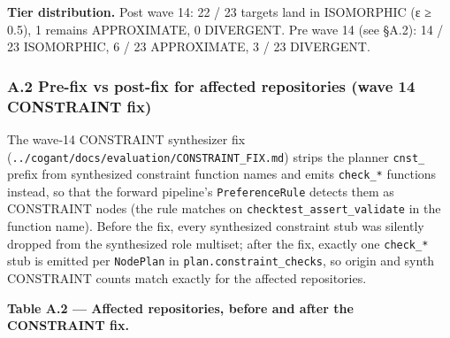 \documentclass[
]{article}
\begin{document}
\textbf{Tier distribution.} Post wave 14: 22 / 23 targets land in
ISOMORPHIC (ε ≥ 0.5), 1 remains APPROXIMATE, 0 DIVERGENT. Pre wave 14
(see §A.2): 14 / 23 ISOMORPHIC, 6 / 23 APPROXIMATE, 3 / 23 DIVERGENT.

\subsubsection{A.2 Pre-fix vs post-fix for affected repositories (wave
14 CONSTRAINT
fix)}\label{a.2-pre-fix-vs-post-fix-for-affected-repositories-wave-14-constraint-fix}

The wave‑14 CONSTRAINT synthesizer fix
(\texttt{../cogant/docs/evaluation/CONSTRAINT\_FIX.md}) strips the
planner \texttt{cnst\_} prefix from synthesized constraint function
names and emits \texttt{check\_*} functions instead, so that the forward
pipeline's \texttt{PreferenceRule} detects them as CONSTRAINT nodes (the
rule matches on
\texttt{check\mid{}test\_\mid{}assert\_\mid{}validate} in
the function name). Before the fix, every synthesized constraint stub
was silently dropped from the synthesized role multiset; after the fix,
exactly one \texttt{check\_*} stub is emitted per \texttt{NodePlan} in
\texttt{plan.constraint\_checks}, so origin and synth CONSTRAINT counts
match exactly for the affected repositories.

\textbf{Table A.2 --- Affected repositories, before and after the
CONSTRAINT fix.}
\end{document}
